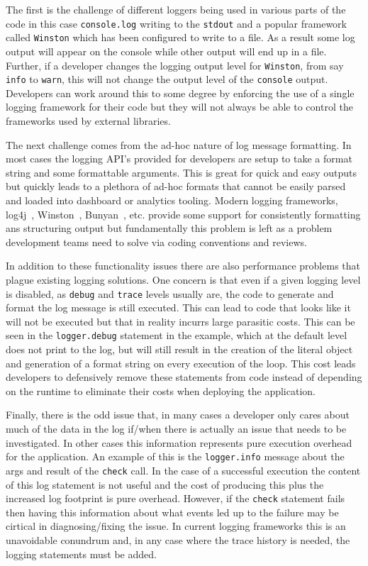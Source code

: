 \documentclass[twocolumn,10pt]{article}
\begin{document}
The first is the challenge of different loggers being used in various parts of
the code in this case \texttt{console.log} writing to the \texttt{stdout} and a
popular framework called \texttt{Winston} which has been configured to write to
a file. As a result some log output will appear on the console while other
output will end up in a file. Further, if a developer changes the logging output
level for \texttt{Winston}, from say \texttt{info} to \texttt{warn}, this will
not change the output level of the \texttt{console} output. Developers can work
around this to some degree by enforcing the use of a single logging framework
for their code but they will not always be able to control the frameworks used
by external libraries.

The next challenge comes from the ad-hoc nature of log message formatting. In
most cases the logging API's provided for developers are setup to take a format
string and some formattable arguments. This is great for quick and easy outputs
but quickly leads to a plethora of ad-hoc formats that cannot be easily parsed
and loaded into dashboard or analytics tooling. Modern logging frameworks,
log4j~\cite{log4j}, Winston~\cite{Winston}, Bunyan~\cite{Bunyan}, etc. provide
some support for consistently formatting ans structuring output but
fundamentally this problem is left as a problem development teams need to solve
via coding conventions and reviews.

In addition to these functionality issues there are also performance problems
that plague existing logging solutions. One concern is that even if a given
logging level is disabled, as \texttt{debug} and \texttt{trace} levels usually
are, the code to generate and format the log message is still executed. This can
lead to code that looks like it will not be executed but that in reality incurrs
large parasitic costs. This can be seen in the \texttt{logger.debug} statement
in the example, which at the default level does not print to the log, but will
still result in the creation of the literal object and generation of a format
string on every execution of the loop. This cost leads developers to defensively
remove these statements from code instead of depending on the runtime to
eliminate their costs when deploying the application.

Finally, there is the odd issue that, in many cases a developer only cares about
much of the data in the log if/when there is actually an issue that needs to be
investigated. In other cases this information represents pure execution overhead
for the application. An example of this is the \texttt{logger.info} message
about the args and result of the \texttt{check} call. In the case of a
successful execution the content of this log statement is not useful and the
cost of producing this plus the increased log footprint is pure overhead.
However, if the \texttt{check} statement fails then having this information
about what events led up to the failure may be cirtical in diagnosing/fixing the
issue. In current logging frameworks this is an unavoidable conundrum and, in
any case where the trace history is needed, the logging statements must be
added.
\end{document}
